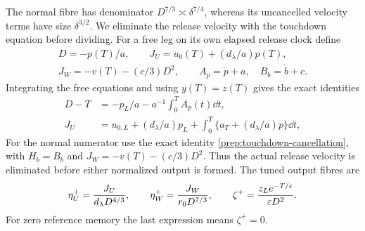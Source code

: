 The normal fibre has denominator $D^{7/3}\asymp\delta^{7/4}$,
whereas its uncancelled velocity terms have size $\delta^{3/2}$.
We eliminate the release velocity with the touchdown equation before
dividing. For a free leg on its own elapsed release clock define
\begin{equation}
 \begin{gathered}
 D=-p(T)/a,\qquad J_U=u_0(T)+(d_\lambda/a)p(T),\\
 J_W=-v(T)-(c/3)D^2,\qquad
 A_p=\dot p+a,\quad B_b=\dot b+c.
 \end{gathered}\label{ret:critical-numerators}
\end{equation}
Integrating the free equations and using $y(T)=z(T)$ gives the exact
identities
\begin{align}
 D-T&=-p_L/a-a^{-1}\int_0^T A_p(t)\dd t,
 \label{ret:flight-offset}\\
 J_U&=u_{0,L}+(d_\lambda/a)p_L+
    \int_0^T\{a_T+(d_\lambda/a)\dot p\}\dd t,
 \label{ret:slip-cancellation}
\end{align}
For the normal numerator use the exact identity
\eqref{prep:touchdown-cancellation}, with $H_b=B_b$ and
$J_W=-v(T)-(c/3)D^2$. Thus the actual release velocity is eliminated
before either normalized output is formed.
The tuned output fibres are
\begin{equation}
 \eta_U^+=\frac{J_U}{d_\lambda D^{4/3}},\qquad
 \eta_W^+=\frac{J_W}{r_0D^{7/3}},\qquad
 \zeta^+=\frac{z_Le^{-T/\varepsilon}}{\varepsilon D^2}.
 \label{ret:normalization}
\end{equation}
For zero reference memory the last expression means $\zeta^+=0$.

